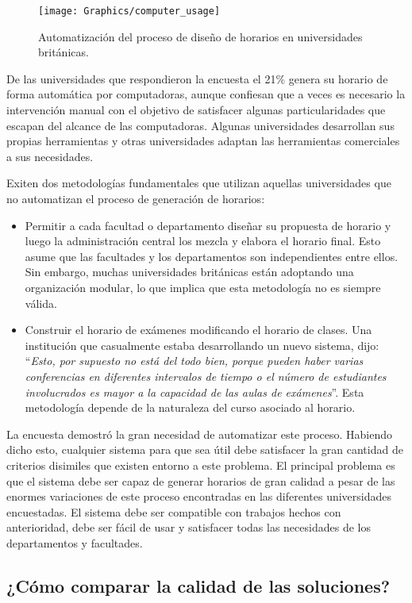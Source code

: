 \begin{figure}
	\texttt{[image: Graphics/computer\_usage]}
	\caption{Automatización del proceso de diseño de horarios en universidades británicas.}
\end{figure}

De las universidades que respondieron la encuesta el 21\% genera su horario de forma automática por
computadoras, aunque confiesan que a veces es necesario la intervención manual con el objetivo de satisfacer
algunas particularidades que escapan del alcance de las computadoras. Algunas universidades desarrollan
sus propias herramientas y otras universidades adaptan las herramientas comerciales a sus necesidades.

Exiten dos metodologías fundamentales que utilizan aquellas universidades que no automatizan el proceso de
generación de horarios:

\begin{itemize}
	\item Permitir a cada facultad o departamento diseñar su propuesta de horario y luego la administración
		central los mezcla y elabora el horario final. Esto asume que las facultades y los departamentos
		son independientes entre ellos. Sin embargo, muchas universidades británicas están adoptando una
		organización modular, lo que implica que esta metodología no es siempre válida.
	\item Construir el horario de exámenes modificando el horario de clases. Una institución que casualmente
		estaba desarrollando un nuevo sistema, dijo: ``\emph{Esto, por supuesto no está del todo bien, porque
		pueden haber varias conferencias en diferentes intervalos de tiempo o el número de estudiantes involucrados
		es mayor a la capacidad de las aulas de exámenes}''. Esta metodología depende de la naturaleza del curso
		asociado al horario.
\end{itemize}

La encuesta demostró la gran necesidad de automatizar este proceso. Habiendo dicho esto, cualquier sistema
para que sea útil debe satisfacer la gran cantidad de criterios disimiles que existen entorno a este problema.
El principal problema es que el sistema debe ser capaz de generar horarios de gran calidad a pesar de las enormes
variaciones de este proceso encontradas en las diferentes universidades encuestadas. El sistema debe ser compatible
con trabajos hechos con anterioridad, debe ser fácil de usar y satisfacer todas las necesidades de los departamentos y facultades.

\subsection{¿Cómo comparar la calidad de las soluciones?}

